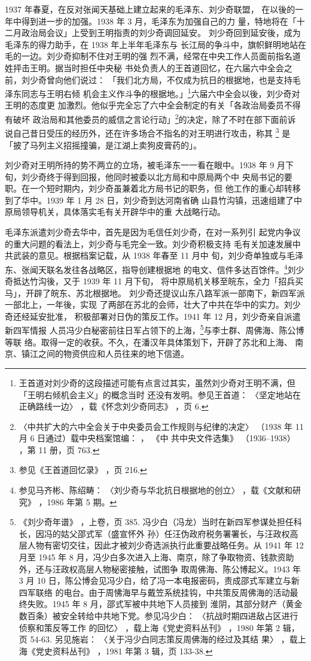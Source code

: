 1937 年春夏，在反对张闻天基础上建立起来的毛泽东、刘少奇联盟，
在以後的一年中得到进一步的加强。1938 年 3 月，毛泽东为加强自己的力
量，特地将在「十二月政治局会议」上受到王明指责的刘少奇调回延安。
刘少奇回到延安後，成为毛泽东的得力助手，在 1938 年上半年毛泽东与
长江局的争斗中，旗帜鲜明地站在毛的一边。刘少奇抑制不住对王明的强
烈不满，经常在中央工作人员面前指名道姓抨击王明。据当时担任中央秘
书处负责人的王首道回忆，在六届六中全会之前，刘少奇曾向他们说过：
「我们北方局，不仅成为抗日的根据地，也是支持毛泽东同志与王明右倾
机会主义作斗争的根据地。」\footnote{王首道对刘少奇的这段描述可能有点言过其实，虽然刘少奇对王明不满，但「王明右倾机会主义」的概念当时
还没有发明。参见王首道：
〈坚定地站在正确路线一边〉
，载《怀念刘少奇同志》
，页 6. }六届六中全会以後，刘少奇对王明的态度更
加激烈。他似乎完全忘了六中全会制定的有关「各政治局委员不得有破坏
政治局和其他委员的威信之言论行动」\footnote{〈中共扩大的六中全会关于中央委员会工作规则与纪律的决定〉
（1938 年 11 月 6 日通过）载中央档案馆编：
，
《中
共中央文件选集》
（1936--1938）
，第 11 册，页 763. 
}的决定，除了不时在部下面前诉
说自己昔日受压的经历外，还在许多场合不指名的对王明进行攻击，称其
\footnote{参见《王首道回忆录》
，页 216. 
}
是「披了马列主义招摇撞骗，是江湖上卖狗皮膏药的」。

刘少奇对王明所持的势不两立的立场，被毛泽东一一看在眼中。1938
年 9 月下旬，刘少奇终于得到回报，他同时被委以北方局和中原局两个中
央局书记的要职。在一个短时期内，刘少奇虽兼着北方局书记的职务，但
他工作的重心却转移到了华中。1939 年 1 月 28 日，刘少奇到达河南省确
山县竹沟镇，迅速组建了中原局领导机关，具体落实毛有关开辟华中的重
大战略行动。

毛泽东派遣刘少奇去华中，首先是因为毛信任刘少奇，在对一系列引
起党内争议的重大问题的看法上，刘少奇与毛完全一致。刘少奇积极支持
毛有关加速发展中共武装的意见。根据档案记载，从 1938 年春至 11 月中
旬，刘少奇单独或与毛泽东、张闻天联名发往各战略区，指导创建根据地
的电文、信件多达百馀件。\footnote{参见马齐彬、陈绍畴：
〈刘少奇与华北抗日根据地的创立〉
，载《文献和研究》
，1986 年第 5 期。
}刘少奇抵达竹沟後，又于 1939 年 11 月下旬，
将中原局机关移至皖东，全力「招兵买马」，开辟了皖东、苏北根据地。
刘少奇还提议山东八路军派一部南下，新四军派一部北上，一年後，实现
了两部在苏北的会师，壮大了中共在华中的实力。刘少奇还经延安批准，
积极部署对日伪的策反工作。1941 年 12 月，刘少奇亲自派遣新四军情报
人员冯少白秘密前往日军占领下的上海，\footnote{《刘少奇年谱》
，上卷，页 385. 冯少白（冯龙）当时在新四军参谋处担任科长，因冯的姑父邵式军（盛宣怀外
孙）任汪伪政府税务署署长，与汪政权高层人物有密切交往，因此才被刘少奇选派执行此重要战略任务。从 1941 年 12
月至 1945 年 8 月，冯少白多次进入上海、南京，除了争取物资、钱款资助外，还与汪政权高层人物秘密接触，试图争
取周佛海、陈公博起义。1943 年 3 月 10 日，陈公博会见冯少白，给了冯一本电报密码，责成邵式军建立与新四军联络
的电台。由于周怫海早与戴笠系统挂钩，中共策反周佛海的活动最终失败。1945 年 8 月，邵式军被中共地下人员接到
淮阴，其部分财产（黄金数百条）被安全转给中共地下党。参见冯少白：
〈抗战时期四进敌占区进行侦察和策反等工作
的回忆〉
，载上海《党史资料丛刊》
，1980 年第 2 辑，页 54-63. 另见施岩：
〈关于冯少白同志策反周佛海的经过及其结
果〉
，载上海《党史资料丛刊》
，1981 年第 3 辑，页 133-38. 
}与李士群、周佛海、陈公博等联
络。取得一定的收获。不久，在潘汉年具体策划下，开辟了苏北和上海、
南京、镇江之间的物资供应和人员往来的地下信道。

